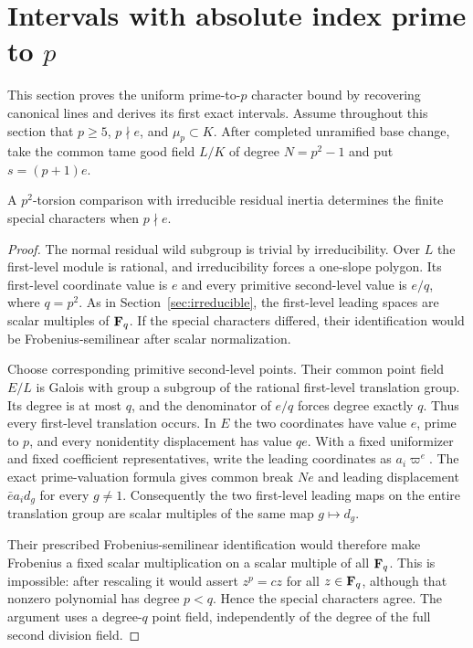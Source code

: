 \section{Intervals with absolute index prime to $p$}\label{sec:prime-to-p}
This section proves the uniform prime-to-$p$ character bound by recovering canonical lines and derives its first exact intervals.
Assume throughout this section that $p\ge5$, $p\nmid e$, and $\mu_p\subset K$. After completed unramified base change, take the common tame good field $L/K$ of degree $N=p^2-1$ and put $s=(p+1)e$.

\begin{lemma}\label{lem:prime-index-irreducible}
A $p^2$-torsion comparison with irreducible residual inertia determines the finite special characters when $p\nmid e$.
\end{lemma}
\begin{proof}
The normal residual wild subgroup is trivial by irreducibility. Over $L$ the first-level module is rational, and irreducibility forces a one-slope polygon. Its first-level coordinate value is $e$ and every primitive second-level value is $e/q$, where $q=p^2$. As in Section~\ref{sec:irreducible}, the first-level leading spaces are scalar multiples of $\mathbf F_q$. If the special characters differed, their identification would be Frobenius-semilinear after scalar normalization.

Choose corresponding primitive second-level points. Their common point field $E/L$ is Galois with group a subgroup of the rational first-level translation group. Its degree is at most $q$, and the denominator of $e/q$ forces degree exactly $q$. Thus every first-level translation occurs. In $E$ the two coordinates have value $e$, prime to $p$, and every nonidentity displacement has value $qe$. With a fixed uniformizer and fixed coefficient representatives, write the leading coordinates as $a_i\varpi^e$. The exact prime-valuation formula gives common break $Ne$ and leading displacement $\bar e a_i d_g$ for every $g\ne1$. Consequently the two first-level leading maps on the entire translation group are scalar multiples of the same map $g\mapsto d_g$.

Their prescribed Frobenius-semilinear identification would therefore make Frobenius a fixed scalar multiplication on a scalar multiple of all $\mathbf F_q$. This is impossible: after rescaling it would assert $z^p=c z$ for all $z\in\mathbf F_q$, although that nonzero polynomial has degree $p<q$. Hence the special characters agree. The argument uses a degree-$q$ point field, independently of the degree of the full second division field.
\end{proof}

